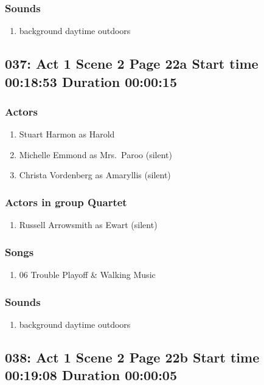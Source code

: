 \subsubsection{Sounds}
\begin{enumerate}
\item background daytime outdoors
\end{enumerate}
\subsection{037: Act 1 Scene 2 Page 22a Start time 00:18:53 Duration 00:00:15}

\subsubsection{Actors}
\begin{enumerate}
\item Stuart Harmon as Harold
\item Michelle Emmond as Mrs.~Paroo (silent)
\item Christa Vordenberg as Amaryllis (silent)
\end{enumerate}
\subsubsection{Actors in group Quartet}
\begin{enumerate}
\item Russell Arrowsmith as Ewart (silent)
\end{enumerate}

\subsubsection{Songs}
\begin{enumerate}
\item 06 Trouble Playoff \& Walking Music
\end{enumerate}\subsubsection{Sounds}
\begin{enumerate}
\item background daytime outdoors
\end{enumerate}
\subsection{038: Act 1 Scene 2 Page 22b Start time 00:19:08 Duration 00:00:05}

